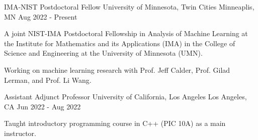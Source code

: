 

\begin{cventries}

  \cventry
    {IMA-NIST Postdoctoral Fellow} %
    {University of Minnesota, Twin Cities} %
    {Minneaplis, MN} %
    {Aug 2022 - Present} %
    {
      \begin{cvitems} %
        \item {A joint NIST-IMA Postdoctoral Fellowship in Analysis of Machine Learning at the Institute for Mathematics and its Applications (IMA) in the College of Science and Engineering at the University of Minnesota (UMN).}
        \item {Working on machine learning research with Prof. Jeff Calder, Prof. Gilad Lerman, and Prof. Li Wang.}
      \end{cvitems}
    }

  \cventry
    {Assistant Adjunct Professor} %
    {University of California, Los Angeles} %
    {Los Angeles, CA} %
    {Jun 2022 - Aug 2022} %
    {
      \begin{cvitems} %
        \item {Taught introductory programming course in C++ (PIC 10A) as a main instructor.}
      \end{cvitems}
    }

\end{cventries}
